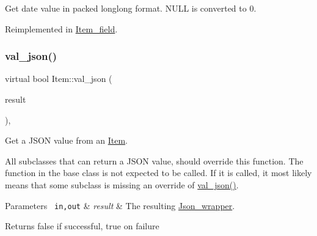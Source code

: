 Get date value in packed longlong format. N\+U\+LL is converted to 0. 

Reimplemented in \mbox{\hyperlink{classItem__field_a181f56468a06623d0c7399868b8fda47}{Item\+\_\+field}}.

\mbox{\label{classItem_a57e763fcde2d0a819d21e31c59611290}} 
\subsubsection{\texorpdfstring{val\+\_\+json()}{val\_json()}}
{\footnotesize\ttfamily virtual bool Item\+::val\+\_\+json (\begin{DoxyParamCaption}\item[{\mbox{\hyperlink{classJson__wrapper}{Json\+\_\+wrapper}} $\ast$}]{result }\end{DoxyParamCaption})\hspace{0.3cm}{\ttfamily [inline]}, {\ttfamily [virtual]}}

Get a J\+S\+ON value from an \mbox{\hyperlink{classItem}{Item}}.

All subclasses that can return a J\+S\+ON value, should override this function. The function in the base class is not expected to be called. If it is called, it most likely means that some subclass is missing an override of \mbox{\hyperlink{classItem_a57e763fcde2d0a819d21e31c59611290}{val\+\_\+json()}}.


\begin{DoxyParams}[1]{Parameters}
\mbox{\texttt{ in,out}}  & {\em result} & The resulting \mbox{\hyperlink{classJson__wrapper}{Json\+\_\+wrapper}}.\\
\hline
\end{DoxyParams}
\begin{DoxyReturn}{Returns}
false if successful, true on failure 
\end{DoxyReturn}


